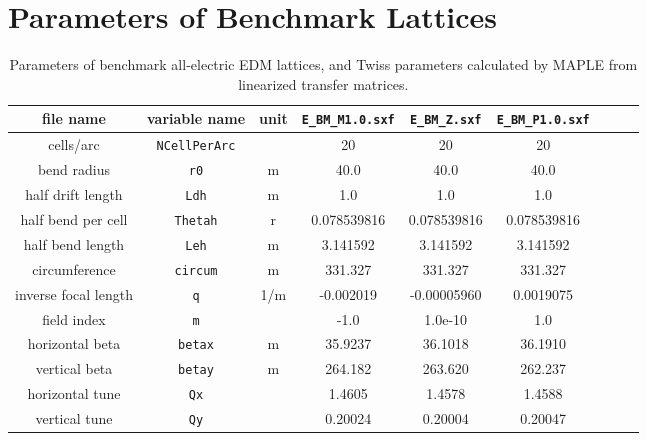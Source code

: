\documentclass[]{article}
\begin{document}
\section{Parameters of Benchmark Lattices}
%
\begin{table}[h]
\caption{\label{tbl:benchmarkParams}Parameters of benchmark all-electric EDM lattices, 
and Twiss parameters calculated by MAPLE from linearized transfer matrices.
} 
\medskip
\centering
\begin{tabular}{|c|c|c|c|c|c|c|c|c|}           \hline
file name         & variable name     & unit & {\tt E\_BM\_M1.0.sxf} & {\tt E\_BM\_Z.sxf} & {\tt E\_BM\_P1.0.sxf} \\ \hline
cells/arc         & {\tt NCellPerArc} &      &      20               &       20           &        20             \\
bend radius       &  {\tt r0}         &  m   &     40.0              &      40.0          &       40.0            \\
half drift length &  {\tt Ldh}        &  m   &      1.0              &     1.0            &        1.0            \\
half bend per cell & {\tt Thetah}     &  r   &   0.078539816         &  0.078539816       &  0.078539816          \\
half bend length  & {\tt Leh}         &  m   &    3.141592           &  3.141592          &   3.141592            \\
circumference     & {\tt circum}      &  m   &   331.327             &   331.327          &    331.327            \\ \hline
inverse focal length &  {\tt q}       & 1/m  &    -0.002019          & -0.00005960        &     0.0019075         \\
field index       &  {\tt m}          &      &     -1.0              &  1.0e-10           &         1.0            \\ \hline
horizontal beta  & {\tt betax}       &  m   &    35.9237            &  36.1018           &     36.1910            \\
vertical beta     & {\tt betay}       &  m   &   264.182             &  263.620           &     262.237            \\ \hline
horizontal tune  &  {\tt Qx}         &      &     1.4605            &   1.4578           &      1.4588            \\
vertical tune     &  {\tt Qy}         &      &     0.20024           &   0.20004          &     0.20047            \\
\hline
\end{tabular}
\end{table}
%
\end{document}
